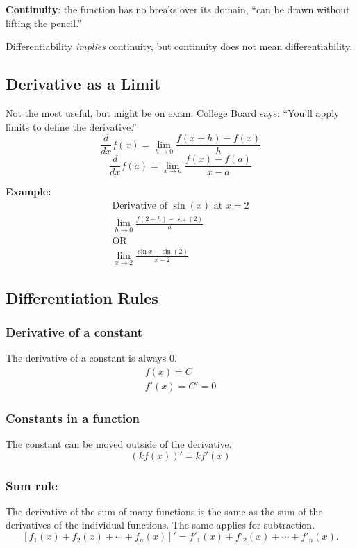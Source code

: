 \documentclass[12pt]{article}
\begin{document}
\noindent \textbf{Continuity}: the function has no breaks over its domain, ``can be drawn without lifting the pencil.''

\noindent Differentiability \textit{implies} continuity, but continuity does not mean differentiability.

\subsection{Derivative as a Limit}
Not the most useful, but might be on exam. College Board says: ``You'll apply limits to define the derivative.''
\[ \frac{d}{dx} f(x) = \lim_{h \to 0} \frac{f(x+h) - f(x)}{h} \]
\[ \frac{d}{dx} f(a) = \lim_{x \to a} \frac{f(x) - f(a)}{x-a} \]

\noindent \textbf{Example:}
\begin{gather*}
    \text{Derivative of $\sin(x)$ at $x=2$} \\
    \lim_{h \to 0} \frac{f(2+h) - \sin{(2)}}{h} \\
    \text{OR} \\
    \lim_{x \to 2} \frac{\sin{x} - \sin{(2)}}{x-2}
\end{gather*}

\subsection{Differentiation Rules}
\subsubsection{Derivative of a constant}
\noindent The derivative of a constant is always $0$.
\begin{gather*}
    f(x) = C \\
    f'(x) = C' = 0
\end{gather*}

\subsubsection{Constants in a function}
\noindent The constant can be moved outside of the derivative.
\[ \left( k f(x) \right)' = k f'(x) \]

\subsubsection{Sum rule}
The derivative of the sum of many functions is the same as the sum of the derivatives of the individual functions. The same applies for subtraction.
\[ \left[ f_1(x) + f_2(x) + \cdots + f_n(x) \right]' = f'_1(x) + f'_2(x) + \cdots + f'_n(x). \]
\end{document}
